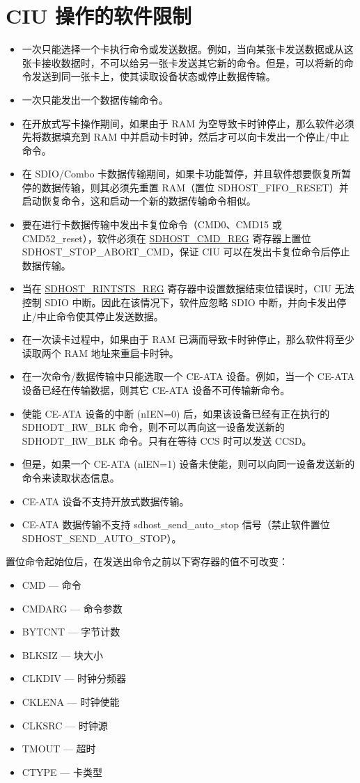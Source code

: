 \documentclass[main\_\_CN.tex]{subfiles}
\begin{document}
\section{CIU 操作的软件限制}
\begin{itemize}
	\item 一次只能选择一个卡执行命令或发送数据。例如，当向某张卡发送数据或从这张卡接收数据时，不可以给另一张卡发送其它新的命令。但是，可以将新的命令发送到同一张卡上，使其读取设备状态或停止数据传输。
	\item 一次只能发出一个数据传输命令。
	\item 在开放式写卡操作期间，如果由于 RAM 为空导致卡时钟停止，那么软件必须先将数据填充到 RAM 中并启动卡时钟，然后才可以向卡发出一个停止/中止命令。
	\item 在 SDIO/Combo 卡数据传输期间，如果卡功能暂停，并且软件想要恢复所暂停的数据传输，则其必须先重置 RAM（置位 SDHOST\_FIFO\_RESET）并启动恢复命令，这和启动一个新的数据传输命令相似。
	\item 要在进行卡数据传输中发出卡复位命令（CMD0、CMD15 或 CMD52\_reset），软件必须在 \hyperref[regdesc:CMDREG]{SDHOST\_CMD\_REG} 寄存器上置位 SDHOST\_STOP\_ABORT\_CMD，保证 CIU 可以在发出卡复位命令后停止数据传输。
	\item 当在 \hyperref[regdesc:RINTSTSREG]{SDHOST\_RINTSTS\_REG} 寄存器中设置数据结束位错误时，CIU 无法控制 SDIO 中断。因此在该情况下，软件应忽略 SDIO 中断，并向卡发出停止/中止命令使其停止发送数据。
    \item 在一次读卡过程中，如果由于 RAM 已满而导致卡时钟停止，那么软件将至少读取两个 RAM 地址来重启卡时钟。
	\item 在一次命令/数据传输中只能选取一个 CE-ATA 设备。例如，当一个 CE-ATA 设备已经在传输数据，则其它 CE-ATA 设备不可传输新命令。
	\item 使能 CE-ATA 设备的中断 (nIEN=0) 后，如果该设备已经有正在执行的 SDHODT\_RW\_BLK 命令，则不可以再向这一设备发送新的 SDHODT\_RW\_BLK 命令。只有在等待 CCS 时可以发送 CCSD。
	\item 但是，如果一个 CE-ATA (nlEN=1) 设备未使能，则可以向同一设备发送新的命令来读取状态信息。
	\item CE-ATA 设备不支持开放式数据传输。
	\item CE-ATA 数据传输不支持 sdhost\_send\_auto\_stop 信号（禁止软件置位 SDHOST\_SEND\_AUTO\_STOP）。
\end{itemize}

置位命令起始位后，在发送出命令之前以下寄存器的值不可改变：

\begin{itemize}
	\item CMD --- 命令
	\item CMDARG --- 命令参数
	\item BYTCNT --- 字节计数
	\item BLKSIZ --- 块大小
	\item CLKDIV --- 时钟分频器
	\item CKLENA --- 时钟使能
	\item CLKSRC --- 时钟源
	\item TMOUT --- 超时
	\item CTYPE --- 卡类型
\end{itemize}
\end{document}
